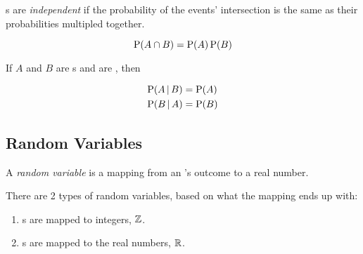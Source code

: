 \begin{definition}[Independent]\label{def:Events_Independent}
  s are \emph{independent} if the probability of the events' intersection is the same as their probabilities multipled together.

  \begin{equation}\label{eq:Events_Independent}
    \operatorname{\operatorname{P}}(A \cap B) = \operatorname{\operatorname{P}}(A) \operatorname{\operatorname{P}}(B)
  \end{equation}

  \begin{remark}
    If $A$ and $B$ are s and are , then

    \begin{equation}\label{eq:Conditional_Probability_Events_Independent}
      \begin{aligned}
        \operatorname{\operatorname{P}}(A \operatorname{\vert} B) &= \operatorname{\operatorname{P}}(A) \\
        \operatorname{\operatorname{P}}(B \operatorname{\vert} A) &= \operatorname{\operatorname{P}}(B) \\
      \end{aligned}
    \end{equation}
  \end{remark}
\end{definition}

\subsection{Random Variables}\label{subsec:Random_Variables}
\begin{definition}\label{def:Random_Variable}
  A \emph{random variable} is a mapping from an 's outcome to a real number.

  There are 2 types of random variables, based on what the mapping ends up with:
  \begin{enumerate}[noitemsep]
  \item {}s are mapped to integers, $\operatorname{\mathbb{Z}}$.
  \item {}s are mapped to the real numbers, $\operatorname{\mathbb{R}}$.
  \end{enumerate}
\end{definition}

